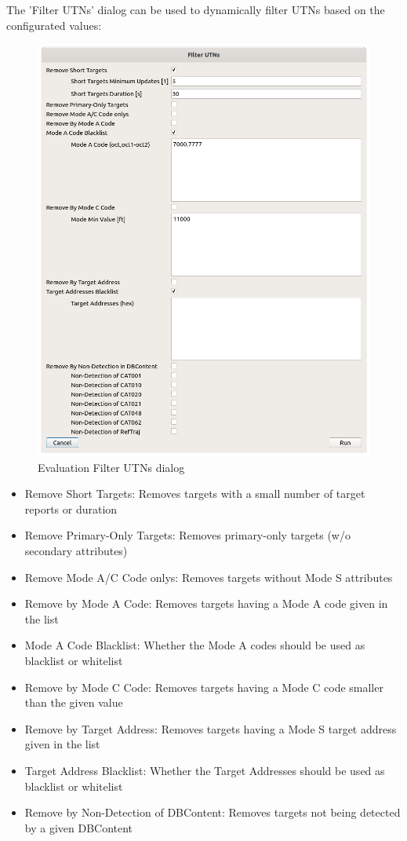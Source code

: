 The 'Filter UTNs' dialog can be used to dynamically filter UTNs based on the configurated values:

\begin{figure}[H]
    \includegraphics[width=15cm]{figures/eval_filter_utns.png}
  \caption{Evaluation Filter UTNs dialog}
\end{figure}

\begin{itemize}  
\item Remove Short Targets: Removes targets with a small number of target reports or duration
\item Remove Primary-Only Targets: Removes primary-only targets (w/o secondary attributes)
\item Remove Mode A/C Code onlys: Removes targets without Mode S attributes
\item Remove by Mode A Code: Removes targets having a Mode A code given in the list
\item Mode A Code Blacklist: Whether the Mode A codes should be used as blacklist or whitelist
\item Remove by Mode C Code: Removes targets having a Mode C code smaller than the given value
\item Remove by Target Address: Removes targets having a Mode S target address given in the list
\item Target Address Blacklist: Whether the Target Addresses should be used as blacklist or whitelist
\item Remove by Non-Detection of DBContent: Removes targets not being detected by a given DBContent
\end{itemize}
\ \\

